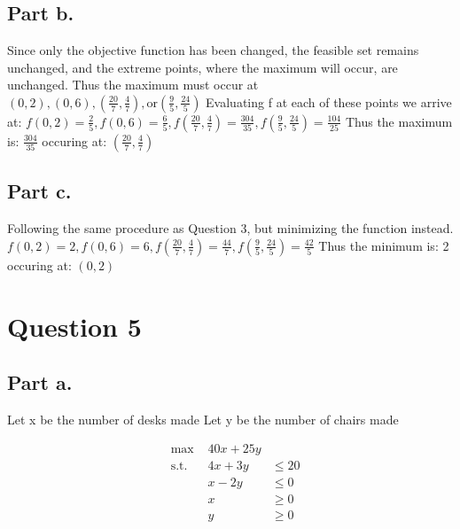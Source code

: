 \documentclass[12pt, letterpaper]{paper}
\begin{document}
\subsection*{Part b.}
Since only the objective function has been changed, the feasible set remains unchanged, and the extreme points, where the maximum will occur, are unchanged. Thus the maximum must occur at $(0,2), (0,6), (\frac{20}{7},\frac{4}{7}), \text{or} (\frac{9}{5}, \frac{24}{5} )$
Evaluating f at each of these points we arrive at:
$f(0,2) = \frac{2}{5}, f(0,6) = \frac{6}{5}, f(\frac{20}{7},\frac{4}{7}) = \frac{304}{35} , f(\frac{9}{5}, \frac{24}{5} ) = \frac{104}{25}$ Thus the maximum is: $\frac{304}{35}$ occuring at: $(\frac{20}{7},\frac{4}{7} )$

\subsection*{Part c.}
Following the same procedure as Question 3, but minimizing the function instead.
$f(0,2) = 2, f(0,6) = 6, f(\frac{20}{7},\frac{4}{7}) = \frac{44}{7} , f(\frac{9}{5}, \frac{24}{5} ) = \frac{42}{5}$ Thus the minimum is: 2 occuring at: $(0,2)$

\section*{Question 5}

\subsection*{Part a.}
Let x be the number of desks made
\newline
Let y be the number of chairs made


\begin{equation*}
\begin{alignedat}{3}
&\text{max }&40x + 25y&\\
&\text{s.t. } &4x+3y&\leq 20 \\
&  &x-2y&\leq 0 \\
& &x &\geq 0\\
& & y &\geq 0\\
\end{alignedat}
\end{equation*}
\end{document}
